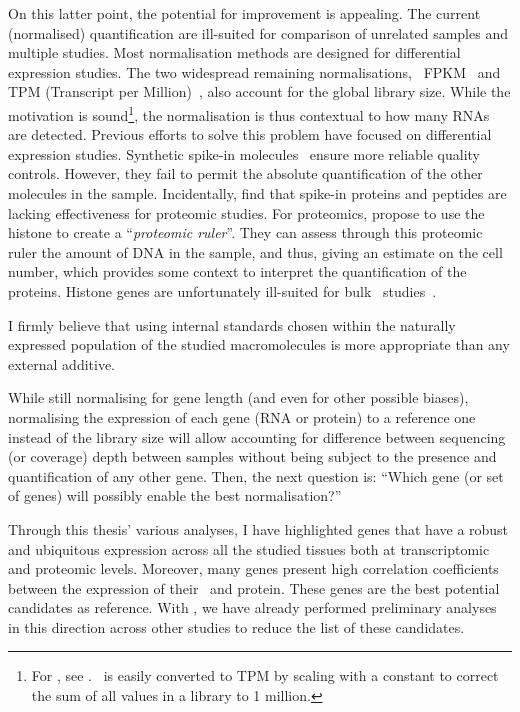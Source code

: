 On this latter point, the potential for improvement is appealing.
The current (normalised) quantification are ill-suited
for comparison of unrelated samples and multiple studies.
Most normalisation methods are designed for differential expression studies.
The two widespread remaining normalisations,
\ie\ \gls{FPKM}~
and TPM (Transcript per Million)~,
also account for the global library size.
While the motivation is sound\footnote{For \FPKM, see .
\FPKM\ is easily converted to TPM by scaling with a constant
to correct the sum of all values in a library to 1 million.
},
the normalisation is thus contextual
to how many \glspl{RNA} are detected.
Previous efforts to solve this problem have focused
on differential expression studies.
Synthetic spike-in molecules~
ensure more reliable quality controls.
However, they fail to permit the absolute quantification
of the other molecules in the sample.
Incidentally, \citet{Rudnick2014-ar} find that spike-in proteins and peptides
are lacking effectiveness for proteomic studies.
For proteomics, \citet{Wisniewski2014-kh} propose
to use the histone to create a \enquote{\emph{proteomic ruler}}.
They can assess through this proteomic ruler the amount of \gls{DNA}
in the sample, and thus, giving an estimate on the cell number,
which provides some context to interpret the quantification of the proteins.
Histone genes are unfortunately ill-suited
for bulk \Rnaseq\ studies~.

I firmly believe that using internal standards chosen
within the naturally expressed population of the studied macromolecules
is more appropriate than any external additive.

While still normalising for gene length
(and even for other possible biases),
normalising the expression of each gene (\gls{RNA} or protein)
to a reference one instead of the library size
will allow accounting for difference between sequencing (or coverage) depth
between samples
without being subject to the presence and quantification of any other gene.
Then, the next question is:
\enquote{Which gene (or set of genes) will possibly enable the best normalisation?}

Through this thesis' various analyses,
I have highlighted genes that have a robust and ubiquitous expression
across all the studied tissues
both at transcriptomic and proteomic levels.
Moreover, many genes present high correlation coefficients
between the expression of their \mRNA\ and protein.
These genes are the best potential candidates as reference.
With \nuno, we have already performed preliminary analyses
in this direction across other studies
to reduce the list of these candidates.

